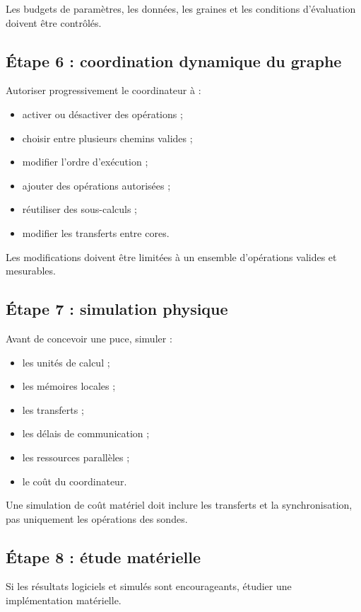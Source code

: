 \documentclass[11pt,a4paper]{article}
\begin{document}
Les budgets de paramètres, les données, les graines et les conditions
d'évaluation doivent être contrôlés.

\subsection{Étape 6 : coordination dynamique du graphe}

Autoriser progressivement le coordinateur à :
\begin{itemize}
  \item activer ou désactiver des opérations ;
  \item choisir entre plusieurs chemins valides ;
  \item modifier l'ordre d'exécution ;
  \item ajouter des opérations autorisées ;
  \item réutiliser des sous-calculs ;
  \item modifier les transferts entre cores.
\end{itemize}

Les modifications doivent être limitées à un ensemble d'opérations
valides et mesurables.

\subsection{Étape 7 : simulation physique}

Avant de concevoir une puce, simuler :
\begin{itemize}
  \item les unités de calcul ;
  \item les mémoires locales ;
  \item les transferts ;
  \item les délais de communication ;
  \item les ressources parallèles ;
  \item le coût du coordinateur.
\end{itemize}

Une simulation de coût matériel doit inclure les transferts et
la synchronisation, pas uniquement les opérations des sondes.

\subsection{Étape 8 : étude matérielle}

Si les résultats logiciels et simulés sont encourageants, étudier
une implémentation matérielle.
\end{document}
